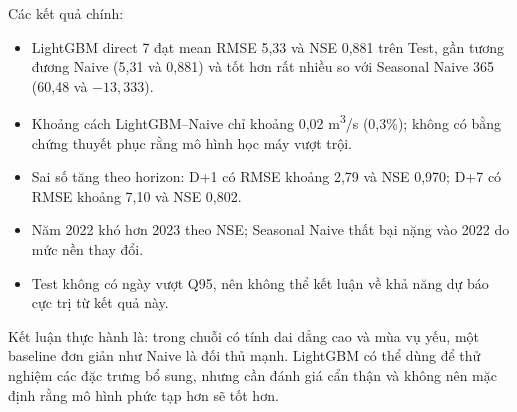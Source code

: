 Các kết quả chính:

\begin{itemize}[leftmargin=1.4em]
  \item LightGBM direct 7 đạt mean RMSE 5,33 và NSE 0,881 trên Test, gần tương
  đương Naive (5,31 và 0,881) và tốt hơn rất nhiều so với Seasonal Naive 365
  (60,48 và $-13,333$).
  \item Khoảng cách LightGBM--Naive chỉ khoảng 0,02 m\textsuperscript{3}/s
  (0,3\%); không có bằng chứng thuyết phục rằng mô hình học máy vượt trội.
  \item Sai số tăng theo horizon: D+1 có RMSE khoảng 2,79 và NSE 0,970; D+7 có
  RMSE khoảng 7,10 và NSE 0,802.
  \item Năm 2022 khó hơn 2023 theo NSE; Seasonal Naive thất bại nặng vào 2022 do
  mức nền thay đổi.
  \item Test không có ngày vượt Q95, nên không thể kết luận về khả năng dự báo
  cực trị từ kết quả này.
\end{itemize}

Kết luận thực hành là: trong chuỗi có tính dai dẳng cao và mùa vụ yếu, một baseline
đơn giản như Naive là đối thủ mạnh. LightGBM có thể dùng để thử nghiệm các đặc
trưng bổ sung, nhưng cần đánh giá cẩn thận và không nên mặc định rằng mô hình phức
tạp hơn sẽ tốt hơn.
